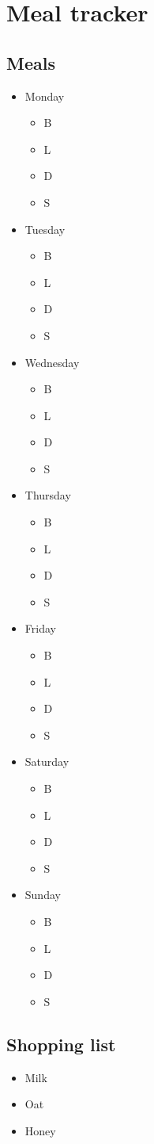 \documentclass[10pt,a4paper]{article}
\begin{document}
\section{Meal tracker}
\subsection{Meals}
\begin{itemize}
  \item Monday
		\begin{itemize}
     \item B
     \item L
     \item D
     \item S
     \end{itemize}
  \item Tuesday
		\begin{itemize}
     \item B
     \item L
     \item D
     \item S
     \end{itemize}
  \item Wednesday
		\begin{itemize}
     \item B
     \item L
     \item D
     \item S
     \end{itemize}
	\item Thursday
		\begin{itemize}
     \item B
     \item L
     \item D
     \item S
     \end{itemize}
	\item Friday
		\begin{itemize}
     \item B
     \item L
     \item D
     \item S
     \end{itemize}
	\item Saturday
		\begin{itemize}
     \item B
     \item L
     \item D
     \item S
     \end{itemize}
	\item	Sunday
		\begin{itemize}
     \item B
     \item L
     \item D
     \item S
     \end{itemize}
\end{itemize}
\subsection{Shopping list}
		\begin{itemize}
     \item Milk
     \item Oat
     \item Honey
     \end{itemize}
\end{document}
